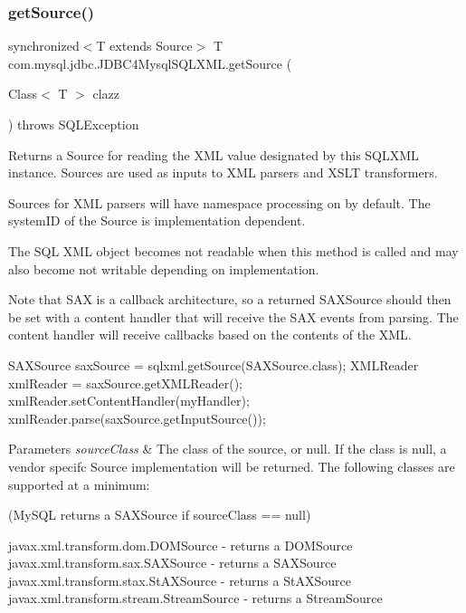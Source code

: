 \subsubsection{\texorpdfstring{get\+Source()}{getSource()}}
{\footnotesize\ttfamily synchronized$<$T extends Source$>$ T com.\+mysql.\+jdbc.\+J\+D\+B\+C4\+Mysql\+S\+Q\+L\+X\+M\+L.\+get\+Source (\begin{DoxyParamCaption}\item[{Class$<$ T $>$}]{clazz }\end{DoxyParamCaption}) throws S\+Q\+L\+Exception}

Returns a Source for reading the X\+ML value designated by this S\+Q\+L\+X\+ML instance. Sources are used as inputs to X\+ML parsers and X\+S\+LT transformers. 

Sources for X\+ML parsers will have namespace processing on by default. The system\+ID of the Source is implementation dependent. 

The S\+QL X\+ML object becomes not readable when this method is called and may also become not writable depending on implementation. 

Note that S\+AX is a callback architecture, so a returned S\+A\+X\+Source should then be set with a content handler that will receive the S\+AX events from parsing. The content handler will receive callbacks based on the contents of the X\+ML.


\begin{DoxyPre}
SAXSource saxSource = sqlxml.getSource(SAXSource.class);
XMLReader xmlReader = saxSource.getXMLReader();
xmlReader.setContentHandler(myHandler);
xmlReader.parse(saxSource.getInputSource());
\end{DoxyPre}



\begin{DoxyParams}{Parameters}
{\em source\+Class} & The class of the source, or null. If the class is null, a vendor specifc Source implementation will be returned. The following classes are supported at a minimum\+:\\
\hline
\end{DoxyParams}
(My\+S\+QL returns a S\+A\+X\+Source if source\+Class == null)


\begin{DoxyPre}
   javax.xml.transform.dom.DOMSource - returns a DOMSource
   javax.xml.transform.sax.SAXSource - returns a SAXSource
   javax.xml.transform.stax.StAXSource - returns a StAXSource
   javax.xml.transform.stream.StreamSource - returns a StreamSource
           \end{DoxyPre}


